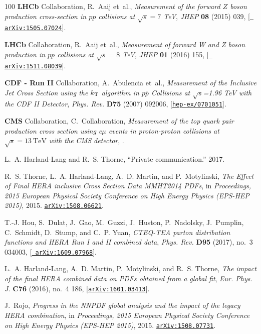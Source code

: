 \begin{thebibliography}{100}
{\bf LHCb} Collaboration, R.~Aaij et~al., {\it {Measurement of the forward $Z$
  boson production cross-section in $pp$ collisions at $\sqrt{s}=7$ TeV}},
  {\em JHEP} {\bf 08} (2015) 039, [\href{http://arxiv.org/abs/1505.07024}{{\tt
  arXiv:1505.07024}}].

{\bf LHCb} Collaboration, R.~Aaij et~al., {\it {Measurement of forward W and Z
  boson production in $pp$ collisions at $ \sqrt{s}=8 $ TeV}},  {\em JHEP} {\bf
  01} (2016) 155, [\href{http://arxiv.org/abs/1511.08039}{{\tt
  arXiv:1511.08039}}].

{\bf CDF - Run II} Collaboration, A.~Abulencia et~al., {\it {Measurement of the
  Inclusive Jet Cross Section using the $k_{\rm T}$ algorithm in
  $p\overline{p}$ Collisions at $\sqrt{s}$=1.96 TeV with the CDF II Detector}},
   {\em Phys. Rev.} {\bf D75} (2007) 092006,
  [\href{http://arxiv.org/abs/hep-ex/0701051}{{\tt hep-ex/0701051}}].

{\bf CMS} Collaboration, C.~Collaboration, {\it {Measurement of the top quark
  pair production cross section using e$\mu$ events in proton-proton collisions
  at $\sqrt{s}=13~\mathrm{TeV}$ with the CMS detector}}, .

L.~A. Harland-Lang and R.~S. Thorne, ``{Private communication}.'' 2017.

R.~S. Thorne, L.~A. Harland-Lang, A.~D. Martin, and P.~Motylinski, {\it {The
  Effect of Final HERA inclusive Cross Section Data MMHT2014 PDFs}},  in {\em
  {Proceedings, 2015 European Physical Society Conference on High Energy
  Physics (EPS-HEP 2015)}}, 2015.
\newblock \href{http://arxiv.org/abs/1508.06621}{{\tt arXiv:1508.06621}}.

T.-J. Hou, S.~Dulat, J.~Gao, M.~Guzzi, J.~Huston, P.~Nadolsky, J.~Pumplin,
  C.~Schmidt, D.~Stump, and C.~P. Yuan, {\it {CTEQ-TEA parton distribution
  functions and HERA Run I and II combined data}},  {\em Phys. Rev.} {\bf D95}
  (2017), no.~3 034003, [\href{http://arxiv.org/abs/1609.07968}{{\tt
  arXiv:1609.07968}}].

L.~A. Harland-Lang, A.~D. Martin, P.~Motylinski, and R.~S. Thorne, {\it {The
  impact of the final HERA combined data on PDFs obtained from a global fit}},
  {\em Eur. Phys. J.} {\bf C76} (2016), no.~4 186,
  [\href{http://arxiv.org/abs/1601.03413}{{\tt arXiv:1601.03413}}].

J.~Rojo, {\it {Progress in the NNPDF global analysis and the impact of the
  legacy HERA combination}},  in {\em {Proceedings, 2015 European Physical
  Society Conference on High Energy Physics (EPS-HEP 2015)}}, 2015.
\newblock \href{http://arxiv.org/abs/1508.07731}{{\tt arXiv:1508.07731}}.


\end{thebibliography}
